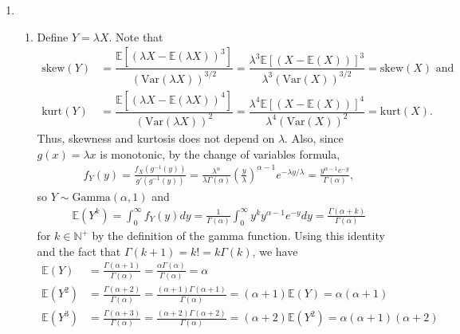 \documentclass[12pt]{article}
\newcommand{\E}{\mathbb{E}}
\newcommand{\p}{\mathbb{P}}
\newcommand{\V}{\text{Var}}
\begin{document}
\begin{enumerate}
    \textit{Lemma:} For random variables $X_n,Y_n,Z_n$ with $X_n,Z_n \overset{p}{\to} \mu \in \mathbb{R}$, $X_n\leq Y_n\leq Z_n\implies Y_n \overset{p}{\to} \mu$. Proof: $X_n\leq Y_n\leq Z_n \implies X_n-\mu\leq Y_n-\mu\leq Z_n-\mu \implies \{|Y_n-\mu|\geq\varepsilon\} \subseteq \{|X_n-\mu|\geq\varepsilon\} \cup \{|Z_n-\mu|\geq\varepsilon\} \implies \lim \limits_{n\to\infty} \p(|Y_n-\mu|\geq\varepsilon) \leq \lim \limits_{n\to\infty} \p(|X_n-\mu|\geq\varepsilon) + \lim \limits_{n\to\infty} \p(|Z_n-\mu|\geq\varepsilon) = 0$.
    \item
    \begin{enumerate}
        \item Define $Y = \lambda X$. Note that
        \begin{align*}
            \text{skew}(Y) &= \dfrac{\E[(\lambda X - \E(\lambda X))^3]}{(\V(\lambda X))^{3/2}} = \dfrac{\lambda^3\E[(X-\E(X))]^3}{\lambda^3(\V(X))^{3/2}} = \text{skew}(X) \text{ and}\\
            \text{kurt}(Y) &= \dfrac{\E[(\lambda X - \E(\lambda X))^4]}{(\V(\lambda X))^2} = \dfrac{\lambda^4\E[(X-\E(X))]^4}{\lambda^4(\V(X))^2} = \text{kurt}(X).
        \end{align*} Thus, skewness and kurtosis does not depend on $\lambda$. Also, since $g(x) = \lambda x$ is monotonic, by the change of variables formula,
        \begin{align*}
            f_Y(y) = \frac{f_X(g^{-1}(y))}{g'(g^{-1}(y))} = \frac{\lambda^\alpha}{\lambda\Gamma(\alpha)}(\frac{y}{\lambda})^{\alpha-1}e^{-\lambda y/\lambda} = \frac{y^{\alpha-1}e^{-y}}{\Gamma(\alpha)},
        \end{align*} so $Y \sim \text{Gamma}(\alpha,1)$ and
        \begin{align*}
            \E(Y^k) = \int_0^\infty f_Y(y)dy = \frac{1}{\Gamma(\alpha)}\int_0^\infty y^k y^{\alpha-1}e^{-y}dy = \frac{\Gamma(\alpha+k)}{\Gamma(\alpha)}
        \end{align*} for $k \in \mathbb{N}^+$ by the definition of the gamma function. Using this identity and the fact that $\Gamma(k+1) = k! = k\Gamma(k)$, we have
        \begin{align*}
            \E(Y) &= \frac{\Gamma(\alpha+1)}{\Gamma(\alpha)} = \frac{\alpha\Gamma(\alpha)}{\Gamma(\alpha)} = \alpha\\
            \E(Y^2) &= \frac{\Gamma(\alpha+2)}{\Gamma(\alpha)} = \frac{(\alpha+1)\Gamma(\alpha+1)}{\Gamma(\alpha)} = (\alpha+1)\E(Y) = \alpha(\alpha+1)\\
            \E(Y^3) &= \frac{\Gamma(\alpha+3)}{\Gamma(\alpha)} = \frac{(\alpha+2)\Gamma(\alpha+2)}{\Gamma(\alpha)} = (\alpha+2)\E(Y^2) = \alpha(\alpha+1)(\alpha+2)\\

\end{align*}
\end{enumerate}
\end{enumerate}
\end{document}
